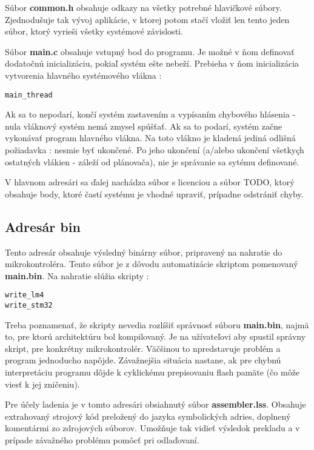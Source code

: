 Súbor \textbf{common.h} obsahuje odkazy na všetky potrebné hlavičkové súbory. Zjednodušuje tak vývoj aplikácie, v ktorej potom stačí vložiť len tento jeden súbor, ktorý vyrieši všetky systémové závislosti.

Súbor \textbf{main.c} obsahuje vstupný bod do programu. Je možné v ňom definovať dodatočnú inicializáciu, pokiaľ systém ešte nebeží. Prebieha v ňom inicializácia vytvorenia hlavného systémového vlákna : 
{\small
\begin{verbatim}
main_thread
\end{verbatim}
}

Ak sa to nepodarí, končí systém zastavením a vypísaním chybového hlásenia - nula vláknový systém nemá zmysel spúšťať. Ak sa to podarí, systém začne vykonávať program hlavného vlákna. Na toto vlákno je kladená jediná odlišná požiadavka : nesmie byť ukončené. Po jeho ukončení (a/alebo ukončení všetkyçh ostatných vlákien - záleží od plánovača), nie je správanie sa sytému definované.

V hlavnom adresári sa ďalej nachádza súbor s licenciou a súbor TODO, ktorý obsahuje body, ktoré častí systému je vhodné upraviť, prípadne odstrániť chyby.

\subsection{Adresár bin}

Tento adresár obsahuje výsledný binárny súbor, pripravený na nahratie do mikrokontroléra. Tento súbor je z dôvodu automatizácie skriptom pomenovaný \textbf{main.bin}. Na nahratie slúžia skripty :
{\small
\begin{verbatim}
write_lm4
write_stm32
\end{verbatim}
}

Treba poznamenať, že skripty nevedia rozlíšiť správnosť súboru \textbf{main.bin}, najmä to, pre ktorú architektúru bol kompilovaný. Je na užívateľovi aby spustil správny skript, pre konkrétny mikrokontrolér. Väčšinou to npredstavuje problém a program jednoducho napôjde. Závažnejšia situácia nastane, ak pre chybnú interpretáciu programu dôjde k cyklickému prepisovaniu flash pamäte (čo môže viesť k jej zničeniu).

Pre účely ladenia je v tomto adresári obsiahnutý súbor \textbf{\textbf{assembler.lss}}. Obsahuje extrahovaný strojový kód preložený do jazyka symbolických adries, doplnený komentármi zo zdrojových súborov. Umožňuje tak vidieť výsledok prekladu a v prípade závažného problému pomôcť pri odlaďovaní.

